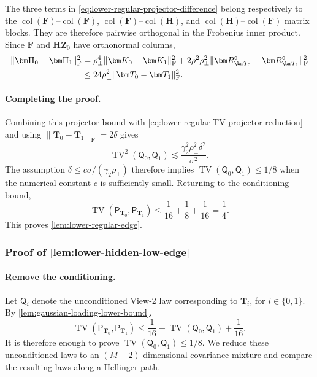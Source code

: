 \documentclass[11pt]{article}
\begin{document}
The three terms in
\cref{eq:lower-regular-projector-difference} belong respectively to the
$\operatorname{col}(\bm F)$--$\operatorname{col}(\bm F)$,
$\operatorname{col}(\bm F)$--$\operatorname{col}(\bm H)$, and
$\operatorname{col}(\bm H)$--$\operatorname{col}(\bm F)$ matrix blocks.
They are therefore pairwise orthogonal in the Frobenius inner product.
Since $\bm F$ and $\bm H\bm Z_0$ have orthonormal columns,
\begin{align}
  \|\bm\Pi_0-\bm\Pi_1\|_{\mathrm F}^2
  &=
  \rho_\perp^4\|\bm K_0-\bm K_1\|_{\mathrm F}^2
  +
  2\rho^2\rho_\perp^2
  \|\bm R_{\bm T_0}^{\circ}
      -\bm R_{\bm T_1}^{\circ}\|_{\mathrm F}^2
  \notag\\
  &\le
  24\rho_\perp^2
  \|\bm T_0-\bm T_1\|_{\mathrm F}^2.
\label{eq:lower-regular-projector-bound}
\end{align}
\paragraph{Completing the proof.}
Combining this projector bound with
\cref{eq:lower-regular-TV-projector-reduction} and using
$\|\bm T_0-\bm T_1\|_{\mathrm F}=2\delta$ gives
\[
  \operatorname{TV}^2(\mathsf Q_0,\mathsf Q_1)
  \lesssim
  \frac{\gamma_2^2\rho_\perp^2\delta^2}{\sigma^2}.
\]
The assumption
$\delta\le c\sigma/(\gamma_2\rho_\perp)$ therefore implies
$\operatorname{TV}(\mathsf Q_0,\mathsf Q_1)\le1/8$ when the numerical
constant $c$ is sufficiently small.  Returning to the conditioning bound,
\[
  \operatorname{TV}(\mathsf P_{\bm T_0},\mathsf P_{\bm T_1})
  \le
  \frac1{16}+\frac18+\frac1{16}
  =\frac14.
\]
This proves \cref{lem:lower-regular-edge}.



\subsubsection{Proof of \cref{lem:lower-hidden-low-edge}}

\paragraph{Remove the conditioning.}
Let $\mathsf Q_i$ denote the unconditioned View-2 law corresponding to
$\bm T_i$, for $i\in\{0,1\}$.  By
\cref{lem:gaussian-loading-lower-bound},
\[
  \operatorname{TV}(\mathsf P_{\bm T_0},\mathsf P_{\bm T_1})
  \le
  \frac1{16}+\operatorname{TV}(\mathsf Q_0,\mathsf Q_1)+\frac1{16}.
\]
It is therefore enough to prove
$\operatorname{TV}(\mathsf Q_0,\mathsf Q_1)\le1/8$.  We reduce these
unconditioned laws to an $(M+2)$-dimensional covariance mixture and compare
the resulting laws along a Hellinger path.
\end{document}
